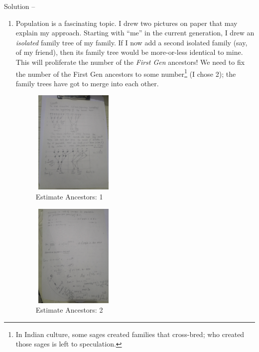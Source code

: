 \documentclass[12pt,a4paper]{book}
\newcommand\Solution[1]{%
   \stepcounter{solution}
    \leavevmode\par\noindent
   {\leftskip37pt
    Solution \textbf{\thesolution} -- #1\par}}
\newcounter{solution}[chapter] %
\begin{document}
\Solution {
    \begin{enumerate}
        \item Population is a fascinating topic. I drew two pictures on paper that may explain my approach. Starting with ``me'' in the current generation, I drew an \emph{isolated} family tree of my family. If I now add a second isolated family (say, of my friend), then its family tree would be more-or-less identical to mine. This will proliferate the number of the \emph{First Gen} ancestors! We need to fix the number of the First Gen ancestors to some number\footnote{In Indian culture, some sages created families that cross-bred; who created those sages is left to speculation.} (I chose 2); the family trees have got to merge into each other. 
        \begin{figure}[h!]
            \centering
            \includegraphics[width=4cm,height=5cm]{ancestry-1.jpg}
            \caption{Estimate Ancestors: 1}
            \label{fig: estimate-ancestors-1}
        \end{figure}
        \begin{figure}[h!]
            \centering
            \includegraphics[width=4cm,height=5cm]{ancestry-2.jpg}
            \caption{Estimate Ancestors: 2}
            \label{fig: estimate-ancestors-2}
        \end{figure}


\end{enumerate}}
\end{document}
